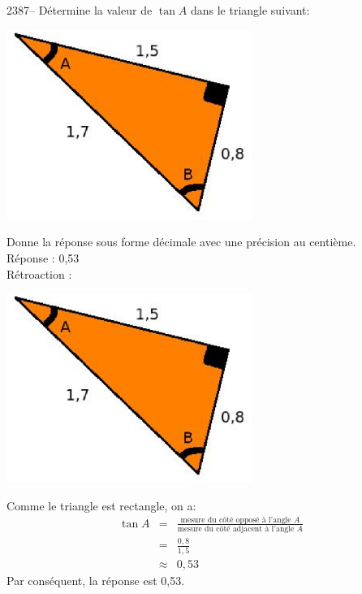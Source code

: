 \documentclass[letterpaper, 12pt]{article}
\begin{document}
2387-- D\'etermine la valeur de $\tan{A}$ dans le triangle suivant:
\begin{center}
 \includegraphics[width=8cm,bb=14 14 415 315]{Q2387.eps}
\end{center}
Donne la r\'eponse sous forme d\'ecimale avec une pr\'ecision au centi\`eme.\\

R\'eponse : 0,53\\

R\'etroaction :\\
\begin{center}
 \includegraphics[width=8cm,bb=14 14 415 315]{Q2387.eps}
\end{center}
Comme le triangle est rectangle, on a:
\begin{eqnarray*}
 \tan{A}&=&\frac{\textrm{mesure du c\^ot\'e oppos\'e \`a l'angle $A$}}{\textrm{mesure du c\^ot\'e adjacent \`a l'angle $A$}}\\
&=&\frac{0,8}{1,5}\\[2mm]
&\approx&0,53
\end{eqnarray*}
Par cons\'equent, la r\'eponse est 0,53.\\
\end{document}
